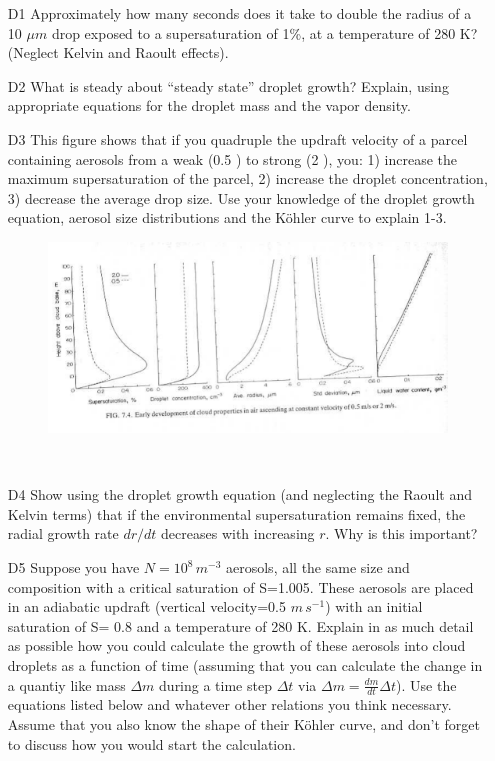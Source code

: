 \documentclass[12pt]{article}
\begin{document}
\begin{enumerate}
\item[D1] Approximately how many seconds does it take to double the radius of
a 10 $\mu m$ drop exposed to a supersaturation of 1\%, at a temperature of
280 K? (Neglect Kelvin and Raoult effects).

\item[D2] What is steady about ``steady state'' droplet growth? Explain,
using appropriate equations for the droplet mass and the vapor density.

\item[D3] This figure  shows that if you quadruple the
updraft velocity of a parcel containing aerosols from a weak (0.5 \ms)
to strong (2 \ms), you: 1) increase the maximum supersaturation
of the parcel, 2) increase the droplet concentration, 3) decrease the average
drop size.  Use your knowledge of the droplet growth equation, aerosol
size distributions and the K\"ohler curve to explain 1-3.

    \begin{figure}[H]
      \begin{center}
        \leavevmode
  \includegraphics[width=6in]{supersat}
        \label{fig:supersat}
    \caption{$ $}
      \end{center}
    \end{figure}

\item[D4] Show using the droplet growth equation (and neglecting the Raoult and Kelvin
terms) that if the environmental supersaturation
remains fixed, the radial growth rate $dr/dt$ decreases with increasing $r$.
Why is this important?


\item[D5] Suppose you have $N=10^8\,m^{-3}$ aerosols, all the same size
  and composition with a critical saturation of S=1.005.  These
  aerosols are placed in an adiabatic updraft (vertical velocity=0.5
  $m\,s^{-1}$) with an initial saturation of S= 0.8 and a temperature
  of 280 K.  Explain in as much detail as possible how you could
  calculate the growth of these aerosols into cloud droplets as a
  function of time (assuming that you can calculate the change in a
  quantiy like mass
  $\Delta m$ during a time step $\Delta t$ via $\Delta m =
  \frac{dm}{dt} \Delta t$). Use the equations listed below and
  whatever other relations you think necessary.  Assume that you also
  know the shape of their K\"ohler curve, and don't forget to discuss
  how you would start the calculation.


\end{enumerate}
\end{document}
